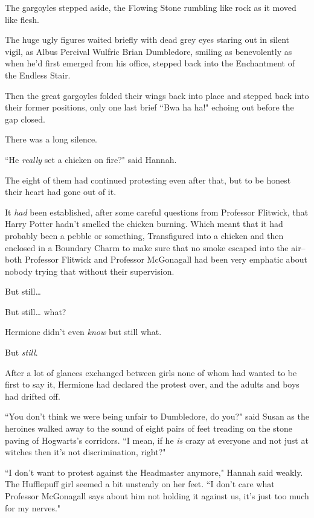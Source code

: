 The gargoyles stepped aside, the Flowing Stone rumbling like rock as it moved like flesh.

The huge ugly figures waited briefly with dead grey eyes staring out in silent vigil, as Albus Percival Wulfric Brian Dumbledore, smiling as benevolently as when he'd first emerged from his office, stepped back into the Enchantment of the Endless Stair.

Then the great gargoyles folded their wings back into place and stepped back into their former positions, only one last brief ``Bwa ha ha!" echoing out before the gap closed.

There was a long silence.

``He \emph{really} set a chicken on fire?" said Hannah.

\later

The eight of them had continued protesting even after that, but to be honest their heart had gone out of it.

It \emph{had} been established, after some careful questions from Professor Flitwick, that Harry Potter hadn't smelled the chicken burning. Which meant that it had probably been a pebble or something, Transfigured into a chicken and then enclosed in a Boundary Charm to make sure that no smoke escaped into the air\---both Professor Flitwick and Professor McGonagall had been very emphatic about nobody trying that without their supervision.

But still{\ldots}

But still{\ldots} what?

Hermione didn't even \emph{know} but still what.

But \emph{still}.

After a lot of glances exchanged between girls none of whom had wanted to be first to say it, Hermione had declared the protest over, and the adults and boys had drifted off.

``You don't think we were being unfair to Dumbledore, do you?" said Susan as the heroines walked away to the sound of eight pairs of feet treading on the stone paving of Hogwarts's corridors. ``I mean, if he \emph{is} crazy at everyone and not just at witches then it's not discrimination, right?"

``I don't want to protest against the Headmaster anymore," Hannah said weakly. The Hufflepuff girl seemed a bit unsteady on her feet. ``I don't care what Professor McGonagall says about him not holding it against us, it's just too much for my nerves."

